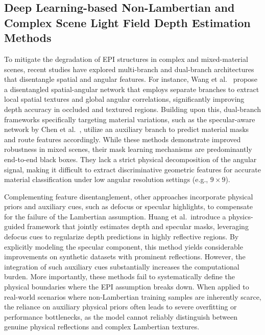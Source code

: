 \documentclass[lettersize,journal]{IEEEtran}
\begin{document}
\subsection{Deep Learning-based Non-Lambertian and Complex Scene Light Field Depth Estimation Methods}

To mitigate the degradation of EPI structures in complex and mixed-material scenes, recent studies have explored multi-branch and dual-branch architectures that disentangle spatial and angular features. For instance, Wang et al.~\cite{honauer2016} propose a disentangled spatial-angular network that employs separate branches to extract local spatial textures and global angular correlations, significantly improving depth accuracy in occluded and textured regions. Building upon this, dual-branch frameworks specifically targeting material variations, such as the specular-aware network by Chen et al.~\cite{li2021}, utilize an auxiliary branch to predict material masks and route features accordingly. While these methods demonstrate improved robustness in mixed scenes, their mask learning mechanisms are predominantly end-to-end black boxes. They lack a strict physical decomposition of the angular signal, making it difficult to extract discriminative geometric features for accurate material classification under low angular resolution settings (e.g., $9 \times 9$).

Complementing feature disentanglement, other approaches incorporate physical priors and auxiliary cues, such as defocus or specular highlights, to compensate for the failure of the Lambertian assumption. Huang et al.~introduce a physics-guided framework that jointly estimates depth and specular masks, leveraging defocus cues to regularize depth predictions in highly reflective regions. By explicitly modeling the specular component, this method yields considerable improvements on synthetic datasets with prominent reflections. However, the integration of such auxiliary cues substantially increases the computational burden. More importantly, these methods fail to systematically define the physical boundaries where the EPI assumption breaks down. When applied to real-world scenarios where non-Lambertian training samples are inherently scarce, the reliance on auxiliary physical priors often leads to severe overfitting or performance bottlenecks, as the model cannot reliably distinguish between genuine physical reflections and complex Lambertian textures.
\end{document}
